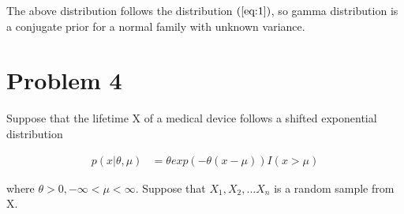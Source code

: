 \documentclass[11pt]{article} %
\begin{document}
\begin{itemize}
The above distribution follows the distribution $(\ref{eq:1})$, so gamma distribution is a conjugate prior for a normal family with unknown variance.

\end{itemize}

\section{Problem 4}
Suppose that the lifetime X of a medical device follows a shifted exponential distribution

\begin{align*}
	p(x|\theta, \mu) &= \theta exp(-\theta (x-\mu)) I(x> \mu)
\end{align*}

where $\theta > 0, -\infty < \mu < \infty$. Suppose that $X_1, X_2, ... X_n$ is a random sample from X.
\end{document}
